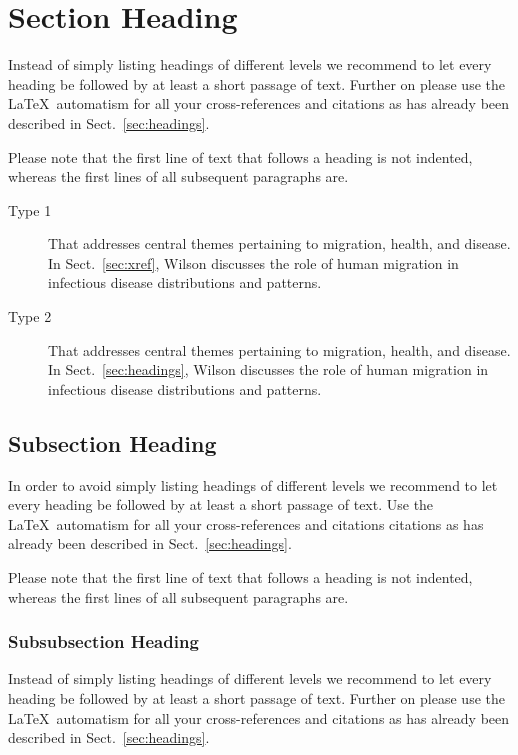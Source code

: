 \documentclass{aip-book}
\theoremstyle{definition}
\begin{document}
\section{Section Heading}

Instead of simply listing headings of different levels we recommend to let every heading be followed by at least a short passage of text. 
Further on please use the \LaTeX\ automatism for all your cross-references and citations as has already been described in Sect.~\ref{sec:headings}.

Please note that the first line of text that follows a heading is not indented, whereas the first lines of all subsequent paragraphs are.

\begin{description}
  \item[Type 1] That addresses central themes pertaining to migration, health, and disease. 
  In Sect.~\ref{sec:xref}, Wilson discusses the role of human migration in infectious disease distributions and patterns.
  \item[Type 2] That addresses central themes pertaining to migration, health, and disease. 
  In Sect.~\ref{sec:headings}, Wilson discusses the role of human migration in infectious disease distributions and patterns.
\end{description}

\subsection{Subsection Heading}

In order to avoid simply listing headings of different levels we recommend to let every heading be followed by at least a short passage of text. 
Use the \LaTeX\ automatism for all your cross-references and citations citations as has already been described in Sect.~\ref{sec:headings}.

Please note that the first line of text that follows a heading is not indented, whereas the first lines of all subsequent paragraphs are.

\subsubsection{Subsubsection Heading}

Instead of simply listing headings of different levels we recommend to let every heading be followed by at least a short passage of text. 
Further on please use the \LaTeX\ automatism for all your cross-references and citations as has already been described in Sect.~\ref{sec:headings}.
\end{document}
